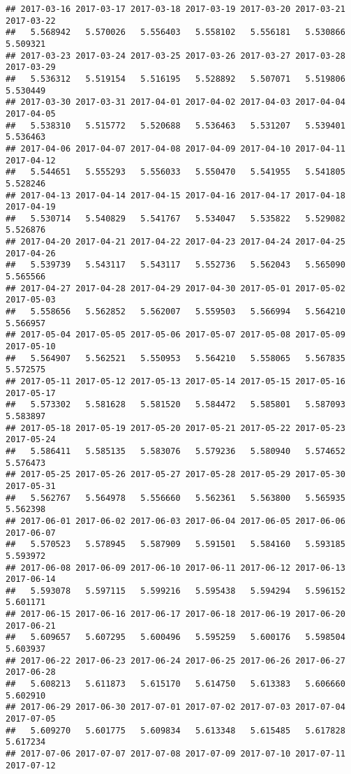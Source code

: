 \documentclass[
]{article}
\begin{document}
\begin{verbatim}
## 2017-03-16 2017-03-17 2017-03-18 2017-03-19 2017-03-20 2017-03-21 2017-03-22 
##   5.568942   5.570026   5.556403   5.558102   5.556181   5.530866   5.509321 
## 2017-03-23 2017-03-24 2017-03-25 2017-03-26 2017-03-27 2017-03-28 2017-03-29 
##   5.536312   5.519154   5.516195   5.528892   5.507071   5.519806   5.530449 
## 2017-03-30 2017-03-31 2017-04-01 2017-04-02 2017-04-03 2017-04-04 2017-04-05 
##   5.538310   5.515772   5.520688   5.536463   5.531207   5.539401   5.536463 
## 2017-04-06 2017-04-07 2017-04-08 2017-04-09 2017-04-10 2017-04-11 2017-04-12 
##   5.544651   5.555293   5.556033   5.550470   5.541955   5.541805   5.528246 
## 2017-04-13 2017-04-14 2017-04-15 2017-04-16 2017-04-17 2017-04-18 2017-04-19 
##   5.530714   5.540829   5.541767   5.534047   5.535822   5.529082   5.526876 
## 2017-04-20 2017-04-21 2017-04-22 2017-04-23 2017-04-24 2017-04-25 2017-04-26 
##   5.539739   5.543117   5.543117   5.552736   5.562043   5.565090   5.565566 
## 2017-04-27 2017-04-28 2017-04-29 2017-04-30 2017-05-01 2017-05-02 2017-05-03 
##   5.558656   5.562852   5.562007   5.559503   5.566994   5.564210   5.566957 
## 2017-05-04 2017-05-05 2017-05-06 2017-05-07 2017-05-08 2017-05-09 2017-05-10 
##   5.564907   5.562521   5.550953   5.564210   5.558065   5.567835   5.572575 
## 2017-05-11 2017-05-12 2017-05-13 2017-05-14 2017-05-15 2017-05-16 2017-05-17 
##   5.573302   5.581628   5.581520   5.584472   5.585801   5.587093   5.583897 
## 2017-05-18 2017-05-19 2017-05-20 2017-05-21 2017-05-22 2017-05-23 2017-05-24 
##   5.586411   5.585135   5.583076   5.579236   5.580940   5.574652   5.576473 
## 2017-05-25 2017-05-26 2017-05-27 2017-05-28 2017-05-29 2017-05-30 2017-05-31 
##   5.562767   5.564978   5.556660   5.562361   5.563800   5.565935   5.562398 
## 2017-06-01 2017-06-02 2017-06-03 2017-06-04 2017-06-05 2017-06-06 2017-06-07 
##   5.570523   5.578945   5.587909   5.591501   5.584160   5.593185   5.593972 
## 2017-06-08 2017-06-09 2017-06-10 2017-06-11 2017-06-12 2017-06-13 2017-06-14 
##   5.593078   5.597115   5.599216   5.595438   5.594294   5.596152   5.601171 
## 2017-06-15 2017-06-16 2017-06-17 2017-06-18 2017-06-19 2017-06-20 2017-06-21 
##   5.609657   5.607295   5.600496   5.595259   5.600176   5.598504   5.603937 
## 2017-06-22 2017-06-23 2017-06-24 2017-06-25 2017-06-26 2017-06-27 2017-06-28 
##   5.608213   5.611873   5.615170   5.614750   5.613383   5.606660   5.602910 
## 2017-06-29 2017-06-30 2017-07-01 2017-07-02 2017-07-03 2017-07-04 2017-07-05 
##   5.609270   5.601775   5.609834   5.613348   5.615485   5.617828   5.617234 
## 2017-07-06 2017-07-07 2017-07-08 2017-07-09 2017-07-10 2017-07-11 2017-07-12 

\end{verbatim}
\end{document}

